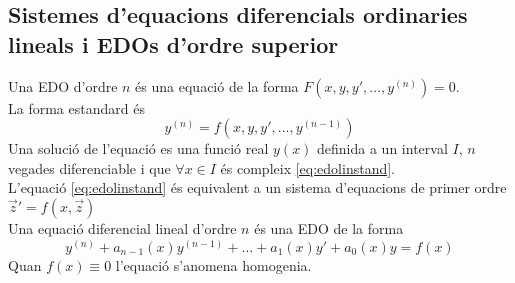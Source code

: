 \documentclass[../main.tex]{subfiles}
\begin{document}
\subsection{Sistemes d'equacions diferencials ordinaries lineals i EDOs d'ordre superior}
Una EDO d'ordre $n$ és una equació de la forma $F(x, y, y', \ldots, y^{(n)}) = 0$.\\
La forma estandard és
\begin{equation}
	y^{(n)} = f(x, y, y', \ldots, y^{(n-1)})
	\label{eq:edolinstand}
\end{equation}
Una solució de l'equació es una funció real $y(x)$ definida a un interval $I$, $n$ vegades diferenciable i que $\forall x \in I$ és compleix \eqref{eq:edolinstand}.\\
L'equació \eqref{eq:edolinstand} és equivalent a un sistema d'equacions de primer ordre $\vec{z}' = f(x, \vec{z})$\\
Una equació diferencial lineal d'ordre $n$ és una EDO de la forma
\begin{displaymath}
	y^{(n)} + a_{n-1}(x)y^{(n-1)} + \ldots + a_1(x)y' + a_0(x)y = f(x)
\end{displaymath}
Quan $f(x)\equiv0$ l'equació s'anomena homogenia.\\
\end{document}
